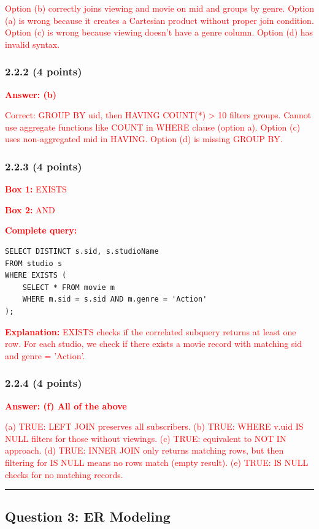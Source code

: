 \documentclass[11pt,a4paper]{article}
\begin{document}
\textcolor{red}{Option (b) correctly joins viewing and movie on mid and groups by genre. Option (a) is wrong because it creates a Cartesian product without proper join condition. Option (c) is wrong because viewing doesn't have a genre column. Option (d) has invalid syntax.}

\subsubsection*{2.2.2 (4 points)}
\textcolor{red}{\textbf{Answer: (b)}}

\textcolor{red}{Correct: GROUP BY uid, then HAVING COUNT(*) > 10 filters groups. Cannot use aggregate functions like COUNT in WHERE clause (option a). Option (c) uses non-aggregated mid in HAVING. Option (d) is missing GROUP BY.}

\subsubsection*{2.2.3 (4 points)}
\textcolor{red}{\textbf{Box 1:} EXISTS}

\textcolor{red}{\textbf{Box 2:} AND}

\textcolor{red}{\textbf{Complete query:}}
\begin{verbatim}
SELECT DISTINCT s.sid, s.studioName
FROM studio s
WHERE EXISTS (
    SELECT * FROM movie m
    WHERE m.sid = s.sid AND m.genre = 'Action'
);
\end{verbatim}

\textcolor{red}{\textbf{Explanation:} EXISTS checks if the correlated subquery returns at least one row. For each studio, we check if there exists a movie record with matching sid and genre = 'Action'.}

\subsubsection*{2.2.4 (4 points)}
\textcolor{red}{\textbf{Answer: (f) All of the above}}

\textcolor{red}{(a) TRUE: LEFT JOIN preserves all subscribers. (b) TRUE: WHERE v.uid IS NULL filters for those without viewings. (c) TRUE: equivalent to NOT IN approach. (d) TRUE: INNER JOIN only returns matching rows, but then filtering for IS NULL means no rows match (empty result). (e) TRUE: IS NULL checks for no matching records.}

\hrule
\vspace{1em}

\subsection*{Question 3: ER Modeling}
\end{document}
